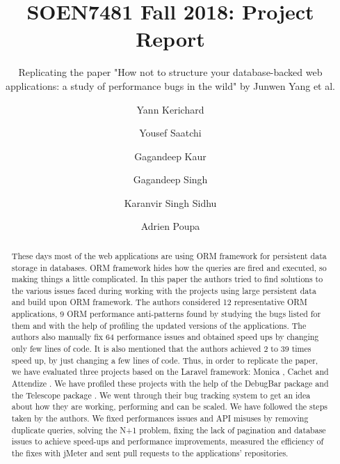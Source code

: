 \documentclass[sigconf]{acmart}
\begin{document}
\title{SOEN7481 Fall 2018: Project Report}
\subtitle{Replicating the paper "How not to structure your database-backed web applications: a study of performance bugs in the wild" by Junwen Yang et al.}

\author{Yann Kerichard}

\author{Yousef Saatchi}

\author{Gagandeep Kaur}

\author{Gagandeep Singh}

\author{Karanvir Singh Sidhu}

\author{Adrien Poupa}


\begin{abstract}
These days most of the web applications are using ORM framework for persistent data storage in databases. ORM framework hides how the queries are fired and executed, so making things a little complicated. In this paper the authors tried to find solutions to the various issues faced during working with the projects using large persistent data and build upon ORM framework. The authors considered 12 representative ORM applications, 9 ORM performance anti-patterns found by studying the bugs listed for them and with the help of profiling the updated versions of the applications. The authors also manually fix 64 performance issues and obtained speed ups by changing only few lines of code. It is also mentioned that the authors achieved 2 to 39 times speed up, by just changing a few lines of code. Thus, in order to replicate the paper, we have evaluated three projects based on the Laravel \cite{laravel} framework: Monica \cite{monica}, Cachet \cite{cachet} and Attendize \cite{attendize}. We have profiled these projects with the help of the DebugBar package \cite{debugbar} and the Telescope package \cite{telescope}. We went through their bug tracking system to get an idea about how they are working, performing  and can be scaled. We have followed the steps taken by the authors. We fixed performances issues and API misuses by removing duplicate queries, solving the N+1 problem, fixing the lack of pagination and database issues to achieve speed-ups and performance improvements, measured the efficiency of the fixes with jMeter and sent pull requests to the applications' repositories.

\end{abstract}
\end{document}
